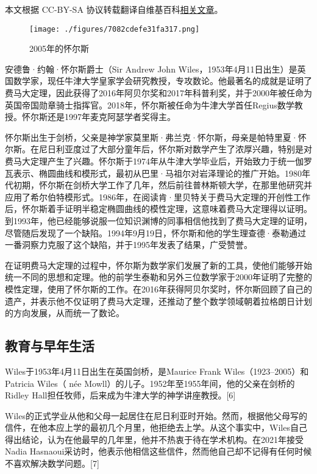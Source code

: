 
本文根据 CC-BY-SA 协议转载翻译自维基百科\href{https://en.wikipedia.org/wiki/Andrew_Wiles}{相关文章}。

\begin{figure}[ht]
\centering
\texttt{[image: ./figures/7082cdefe31fa317.png]}
\caption{2005年的怀尔斯} \label{fig_Andrew_1}
\end{figure}
安德鲁·约翰·怀尔斯爵士（Sir Andrew John Wiles，1953年4月11日出生）是英国数学家，现任牛津大学皇家学会研究教授，专攻数论。他最著名的成就是证明了费马大定理，因此获得了2016年阿贝尔奖和2017年科普利奖，并于2000年被任命为英国帝国勋章骑士指挥官。2018年，怀尔斯被任命为牛津大学首任Regius数学教授。怀尔斯还是1997年麦克阿瑟学者奖得主。

怀尔斯出生于剑桥，父亲是神学家莫里斯·弗兰克·怀尔斯，母亲是帕特里夏·怀尔斯。在尼日利亚度过了大部分童年后，怀尔斯对数学产生了浓厚兴趣，特别是对费马大定理产生了兴趣。怀尔斯于1974年从牛津大学毕业后，开始致力于统一伽罗瓦表示、椭圆曲线和模形式，最初从巴里·马祖尔对岩泽理论的推广开始。1980年代初期，怀尔斯在剑桥大学工作了几年，然后前往普林斯顿大学，在那里他研究并应用了希尔伯特模形式。1986年，在阅读肯·里贝特关于费马大定理的开创性工作后，怀尔斯着手证明半稳定椭圆曲线的模性定理，这意味着费马大定理得以证明。到1993年，他已经能够说服一位知识渊博的同事相信他找到了费马大定理的证明，尽管随后发现了一个缺陷。1994年9月19日，怀尔斯和他的学生理查德·泰勒通过一番洞察力克服了这个缺陷，并于1995年发表了结果，广受赞誉。

在证明费马大定理的过程中，怀尔斯为数学家们发展了新的工具，使他们能够开始统一不同的思想和定理。他的前学生泰勒和另外三位数学家于2000年证明了完整的模性定理，使用了怀尔斯的工作。在2016年获得阿贝尔奖时，怀尔斯回顾了自己的遗产，并表示他不仅证明了费马大定理，还推动了整个数学领域朝着拉格朗日计划的方向发展，从而统一了数论。
\subsection{教育与早年生活}  
Wiles于1953年4月11日出生在英国剑桥，是Maurice Frank Wiles（1923–2005）和Patricia Wiles（ née Mowll）的儿子。1952年至1955年间，他的父亲在剑桥的Ridley Hall担任牧师，后来成为牛津大学的神学讲座教授。[6]  

Wiles的正式学业从他和父母一起居住在尼日利亚时开始。然而，根据他父母写的信件，在他本应上学的最初几个月里，他拒绝去上学。从这个事实中，Wiles自己得出结论，认为在他最早的几年里，他并不热衷于待在学术机构。在2021年接受Nadia Hasnaoui采访时，他表示他相信这些信件，然而他自己却不记得有任何时候不喜欢解决数学问题。[7]  

